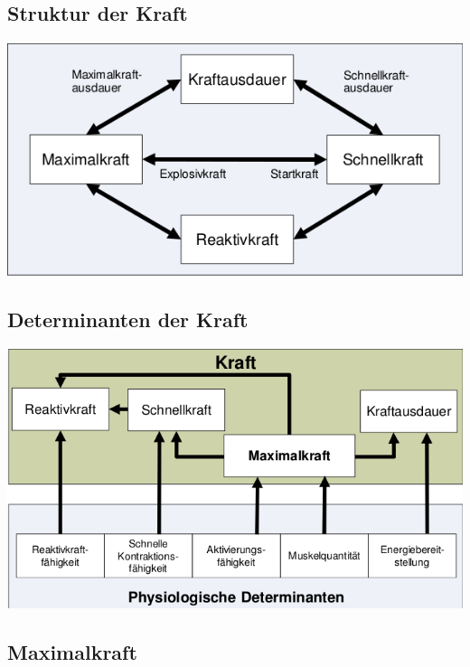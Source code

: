 \subsection{Struktur der Kraft}

\includegraphics[width=\textwidth]{pictures/kraftstruktur}

\subsection{Determinanten der Kraft}
\includegraphics[width=\textwidth]{pictures/kraft_determinanten}

\subsection{Maximalkraft}


